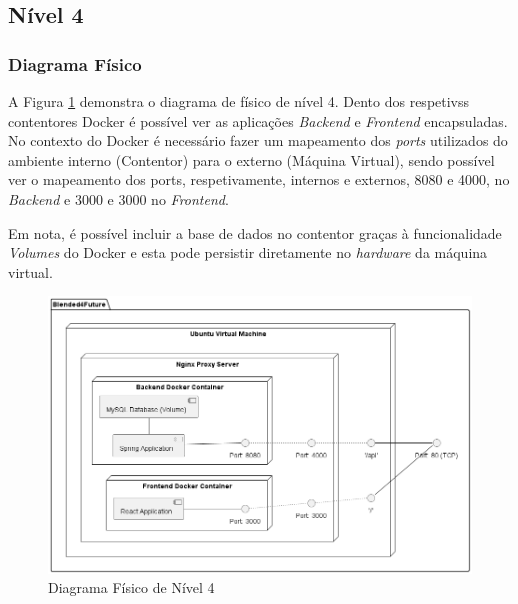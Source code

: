 \subsection{Nível 4}

\subsubsection{Diagrama Físico} 

A Figura \ref{fig:diagram-lvl4-physical} demonstra o diagrama de físico de nível 4. Dento dos respetivss contentores \gls{Docker} é possível ver as aplicações  \textit{Backend} e \textit{Frontend} encapsuladas. No contexto do \gls{Docker} é necessário fazer um mapeamento dos \textit{ports} utilizados do ambiente interno (Contentor) para o externo (Máquina Virtual), sendo possível ver o mapeamento dos ports, respetivamente, internos e externos, 8080 e 4000, no \textit{Backend} e 3000 e 3000 no \textit{Frontend}.

Em nota, é possível incluir a base de dados no contentor graças à funcionalidade \textit{Volumes} do Docker e esta pode persistir diretamente no \textit{hardware} da máquina virtual.

\begin{figure}[h!tbp]
    \centering
    \includegraphics[width=\linewidth]{capitulos/cap3-analisedoproblema/assets/arquiteturasistema/physical/physical_l4.png}
    \caption{Diagrama Físico de Nível 4}
    \label{fig:diagram-lvl4-physical}
\end{figure}